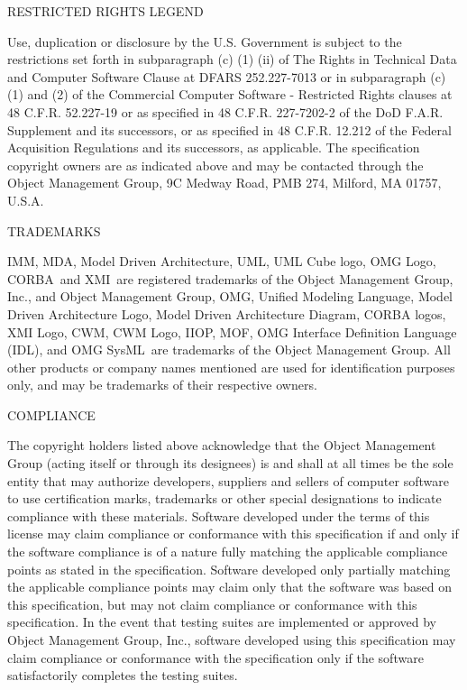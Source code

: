 \begin{center}RESTRICTED RIGHTS LEGEND\end{center}\vspace{-3mm}
Use, duplication or disclosure by the U.S. Government  is subject to the restrictions set forth in subparagraph (c) (1) (ii) of The Rights in Technical Data and Computer Software Clause at DFARS 252.227-7013 or in subparagraph (c)(1) and (2) of the Commercial Computer Software - Restricted Rights clauses at 48 C.F.R. 52.227-19 or as specified in 48 C.F.R. 227-7202-2 of the DoD F.A.R. Supplement and its successors, or as specified in 48 C.F.R. 12.212 of the Federal Acquisition Regulations and its successors, as applicable. The specification copyright owners are as indicated above and may be contacted through the Object Management Group, 9C Medway Road, PMB 274, Milford, MA 01757, U.S.A.

\begin{center}TRADEMARKS\end{center}\vspace{-3mm}
IMM\textregistered , MDA\textregistered , Model Driven Architecture\textregistered , UML\textregistered , UML Cube logo\textregistered , OMG Logo\textregistered , CORBA\textregistered\ and XMI\textregistered\ are registered trademarks of the Object Management Group, Inc., and Object Management Group\texttrademark , OMG\texttrademark , Unified Modeling Language\texttrademark , Model Driven Architecture Logo\texttrademark , Model Driven Architecture Diagram\texttrademark , CORBA logos\texttrademark , XMI Logo\texttrademark , CWM\texttrademark , CWM Logo\texttrademark , IIOP\texttrademark  , MOF\texttrademark  , OMG Interface Definition Language (IDL)\texttrademark  , and OMG SysML\texttrademark\ are trademarks of the Object Management Group. All other products or company names mentioned are used for identification purposes only, and may be trademarks of their respective owners.

\begin{center}COMPLIANCE\end{center}\vspace{-3mm}
The copyright holders listed above acknowledge that the Object Management Group (acting itself or through its designees) is and shall at all times be the sole entity that may authorize developers, suppliers and sellers of computer software to use certification marks, trademarks or other special designations to indicate compliance with these materials.
Software developed under the terms of this license may claim compliance or conformance with this specification if and only if the software compliance is of a nature fully matching the applicable compliance points as stated in the specification. Software developed only partially matching the applicable compliance points may claim only that the software was based on this specification, but may not claim compliance or conformance with this specification. In the event that testing suites are implemented or approved by Object Management Group, Inc., software developed using this specification may claim compliance or conformance with the specification only if the software satisfactorily completes the testing suites.

